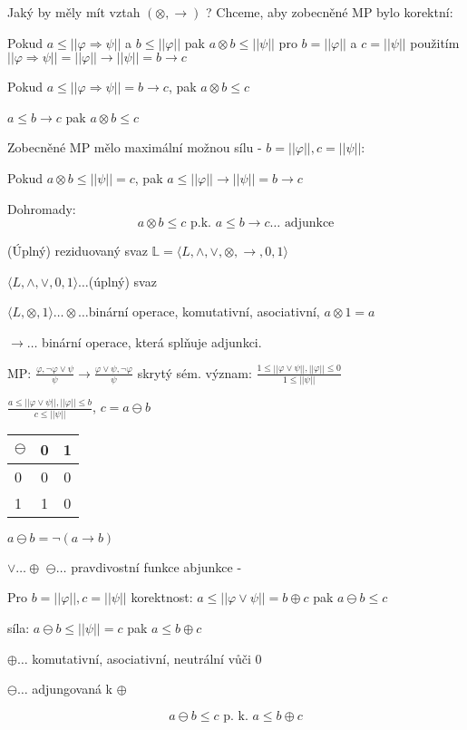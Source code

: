 \documentclass[10pt, a4paper, titlepage]{article}
\theoremstyle{note}
\begin{document}
Jaký by měly mít vztah $(\otimes,\rightarrow)$ ? Chceme, aby zobecněné MP bylo korektní:

Pokud $a\leq||\varphi\Rightarrow\psi||$ a $b\leq||\varphi||$ pak $a\otimes b \leq||\psi||$ pro $b=||\varphi||$ a $c=||\psi||$ použitím $||\varphi\Rightarrow\psi||=||\varphi||\rightarrow||\psi||=b\rightarrow c$

Pokud $a\leq||\varphi\Rightarrow\psi|| = b\rightarrow c$, pak $a\otimes b\leq c$

$a\leq b\rightarrow c$ pak $a\otimes b \leq c$

Zobecněné MP mělo maximální možnou sílu - $b=||\varphi||, c=||\psi||$:

Pokud $a\otimes b\leq||\psi||=c$, pak $a\leq||\varphi||\rightarrow||\psi||=b\rightarrow c$

Dohromady: $$a\otimes b\leq c \text{ p.k. } a\leq b\rightarrow c \dots \text{ adjunkce}$$

(Úplný) reziduovaný svaz $\mathbb{L} = \langle L, \wedge, \vee,\otimes,\rightarrow,0,1\rangle$

$\langle L, \wedge,\vee, 0, 1\rangle \dots$(úplný) svaz

$\langle L, \otimes, 1\rangle\dots\otimes\dots$binární operace, komutativní, asociativní, $a\otimes 1=a$

$\rightarrow\dots$ binární operace, která splňuje adjunkci.

\vspace{1cm}
MP: $\frac{\varphi, \neg\varphi\vee\psi}{\psi} \rightarrow \frac{\varphi\vee\psi, \neg\varphi}{\psi}$ skrytý sém. význam: $\frac{1\leq||\varphi\vee\psi||, ||\varphi||\leq 0}{1\leq||\psi||}$

$\frac{a\leq||\varphi\vee\psi||, ||\varphi||\leq b}{c\leq||\psi||}$, \hspace{2cm} $c=a\ominus b$ \hspace{2cm}   \begin{tabular}{l|*2c}
     \bf $\ominus$ & 0 & 1  \\
     \hline
    0 & 0& 0 \\
    1 & 1 & 0 \\
   \end{tabular} $a \ominus b = \neg(a\rightarrow b)$

$\vee\dots\oplus$\hspace{3cm} $\ominus\dots$ pravdivostní funkce abjunkce - 

Pro $b = ||\varphi||, c=||\psi||$ korektnost: $a\leq||\varphi\vee\psi|| = b\oplus c$ pak $a\ominus b\leq c$

síla: $a\ominus b \leq ||\psi||=c$ pak $a\leq b\oplus c$

$\oplus\dots$ komutativní, asociativní, neutrální vůči 0

$\ominus\dots$ adjungovaná k $\oplus$

$$a\ominus b\leq c \text{ p. k. } a\leq b \oplus c$$
\renewcommand{\indexcolumns}{3}
\printindex
\end{document}

